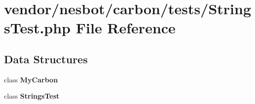 \section{vendor/nesbot/carbon/tests/\+Strings\+Test.php File Reference}
\label{_strings_test_8php}
\subsection*{Data Structures}
\begin{DoxyCompactItemize}
\item 
class {\bf My\+Carbon}
\item 
class {\bf Strings\+Test}
\end{DoxyCompactItemize}
